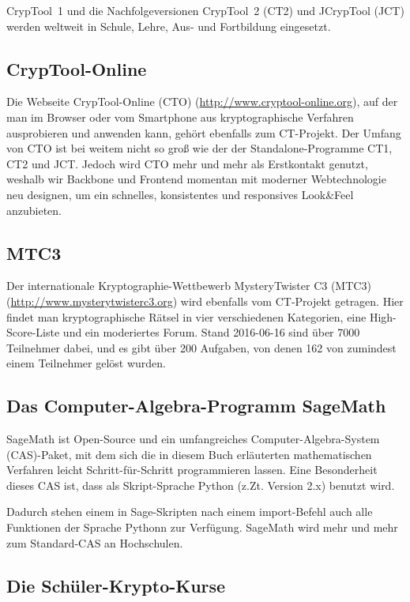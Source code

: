 CrypTool~1 und die Nachfolgeversionen CrypTool~2 (CT2) und JCrypTool (JCT) werden weltweit in Schule, Lehre, Aus- und Fortbildung eingesetzt.

\subsection*{CrypTool-Online}

Die Webseite CrypTool-Online (CTO) (\url{http://www.cryptool-online.org}), auf der man im Browser oder vom Smartphone aus kryptographische Verfahren ausprobieren und anwenden kann, gehört ebenfalls zum CT-Projekt. 
Der Umfang von CTO ist bei weitem nicht so groß wie der der Standalone-Programme CT1, CT2 und JCT. Jedoch wird CTO mehr und mehr als Erstkontakt genutzt, weshalb wir Backbone und Frontend momentan mit moderner Webtechnologie neu designen,
um ein schnelles, konsistentes und responsives Look\&Feel anzubieten.

\subsection*{MTC3}

Der internationale Kryptographie-Wettbewerb MysteryTwister C3 (MTC3) (\url{http://www.mysterytwisterc3.org}) wird ebenfalls vom CT-Projekt getragen.
Hier findet man kryptographische Rätsel in vier verschiedenen Kategorien, eine High-Score-Liste und ein moderiertes Forum. 
Stand 2016-06-16 sind über 7000 Teilnehmer dabei, und es gibt über 200 Aufgaben, von denen 162 von zumindest einem Teilnehmer gelöst wurden.


\subsection*{Das Computer-Algebra-Programm SageMath}

SageMath ist Open-Source und ein umfangreiches Computer-Algebra-System (CAS)-Paket, mit dem sich die in diesem Buch erläuterten mathematischen Verfahren leicht Schritt-für-Schritt programmieren lassen. 
Eine Besonderheit dieses CAS ist, dass als Skript-Sprache Python (z.Zt. Version 2.x) benutzt wird.

Dadurch stehen einem in Sage-Skripten nach einem import-Befehl auch alle Funktionen der Sprache Pythonn zur Verfügung.
SageMath wird mehr und mehr zum Standard-CAS an Hochschulen.

\subsection*{Die Schüler-Krypto-Kurse}

